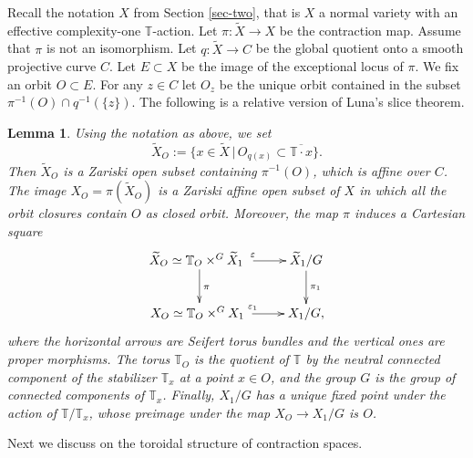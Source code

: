 \documentclass[11pt, reqno]{amsart}
\theoremstyle{plain}
\newtheorem{lemma}[theorem]{Lemma}
\theoremstyle{definition}
\theoremstyle{remark}
\begin{document}
 Recall the notation $X$ from Section \ref{sec-two}, that is $X$
a normal variety with an effective complexity-one $\mathbb{T}$-action.
Let $\pi:\widetilde{X}\rightarrow X$ be the contraction map. Assume that $\pi$ is not an isomorphism. 
Let $q: \widetilde{X}\rightarrow C$
be the global quotient onto a smooth projective curve $C$. Let $E\subset X$ be the image of the exceptional locus of $\pi$. We fix an orbit $O\subset E$.
For any $z\in C$ let $O_{z}$ be the unique orbit contained  in the subset $\pi^{-1}(O)\cap q^{-1}(\{z\})$. The following is a relative version of Luna's slice theorem. 
\begin{lemma}\label{l-diagram}\cite[Lemma 4.4]{AL21}
Using the notation as above, we set
$$\widetilde{X}_{O}:= \{ x\in \widetilde{X}\,|\, O_{q(x)}\subset \overline{\mathbb{T}\cdot x}\}.$$
Then $\widetilde{X}_{O}$ is a Zariski open subset containing $\pi^{-1}(O)$, which is affine over $C$. The image $X_{O} =  \pi(\widetilde{X}_{O})$ is a Zariski affine open subset of $X$ in which all the orbit closures contain $O$ as closed orbit. Moreover, the map $\pi$ induces
a Cartesian square
 $$\xymatrix{
      \widetilde{X}_O \simeq \mathbb{T}_O\times^{G}\widetilde{X}_1\,\,\,\ar[r]^{\varepsilon} \ar[d] ^{\pi} & \widetilde{X}_{1}/G \ar[d]^{\pi_{1}}\\X_O \simeq \mathbb{T}_O\times^{G}X_1\,\, \ar[r]^{\varepsilon_{1}} & X_{1}/G,}$$ 
where the horizontal arrows are Seifert torus bundles and the vertical ones are proper morphisms. The torus $\mathbb{T}_{O}$ is the 
quotient of $\mathbb{T}$ by the neutral connected component of the stabilizer $\mathbb{T}_{x}$ at a point $x\in O$, and the group $G$
is the group of connected components of $\mathbb{T}_{x}$. Finally, $X_{1}/G$ has a unique fixed point under the action of $\mathbb{T}/\mathbb{T}_{x}$,
whose preimage under the map $X_{O}\rightarrow X_{1}/G$ is $O$. 
\end{lemma}
Next we discuss on the toroidal structure of  contraction spaces. 
\end{document}
